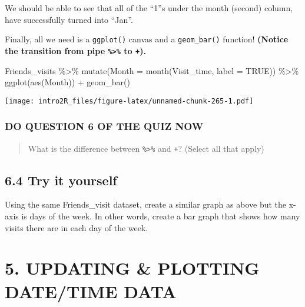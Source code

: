 \documentclass[
]{book}
\newenvironment{Shaded}{\begin{snugshade}}{\end{snugshade}}
\newcommand{\AttributeTok}[1]{\textcolor[rgb]{0.77,0.63,0.00}{#1}}
\newcommand{\ConstantTok}[1]{\textcolor[rgb]{0.00,0.00,0.00}{#1}}
\newcommand{\FunctionTok}[1]{\textcolor[rgb]{0.00,0.00,0.00}{#1}}
\newcommand{\NormalTok}[1]{#1}
\newcommand{\SpecialCharTok}[1]{\textcolor[rgb]{0.00,0.00,0.00}{#1}}
\begin{document}
We should be able to see that all of the ``1''s under the month (second) column, have successfully turned into ``Jan''.

Finally, all we need is a \texttt{ggplot()} canvas and a \texttt{geom\_bar()} function! \textbf{(Notice the transition from pipe \texttt{\%\textgreater{}\%} to \texttt{+}).}

\begin{Shaded}
\begin{Highlighting}[]
\NormalTok{Friends\_visits }\SpecialCharTok{\%\textgreater{}\%} 
    \FunctionTok{mutate}\NormalTok{(}\AttributeTok{Month =} \FunctionTok{month}\NormalTok{(Visit\_time, }\AttributeTok{label =} \ConstantTok{TRUE}\NormalTok{)) }\SpecialCharTok{\%\textgreater{}\%}
    \FunctionTok{ggplot}\NormalTok{(}\FunctionTok{aes}\NormalTok{(Month)) }\SpecialCharTok{+}
    \FunctionTok{geom\_bar}\NormalTok{()}
\end{Highlighting}
\end{Shaded}

\texttt{[image: intro2R\_files/figure-latex/unnamed-chunk-265-1.pdf]}

\hypertarget{do-question-6-of-the-quiz-now-2}{%
\subsubsection{DO QUESTION 6 OF THE QUIZ NOW}\label{do-question-6-of-the-quiz-now-2}}

\begin{quote}
What is the difference between \texttt{\%\textgreater{}\%} and \texttt{+}? (Select all that apply)
\end{quote}

\hypertarget{try-it-yourself-31}{%
\subsection{6.4 Try it yourself}\label{try-it-yourself-31}}

Using the same Friends\_visit dataset, create a similar graph as above but the x-axis is days of the week. In other words, create a bar graph that shows how many visits there are in each day of the week.

\hypertarget{updating-plotting-datetime-data}{%
\section{5. UPDATING \& PLOTTING DATE/TIME DATA}\label{updating-plotting-datetime-data}}
\end{document}
